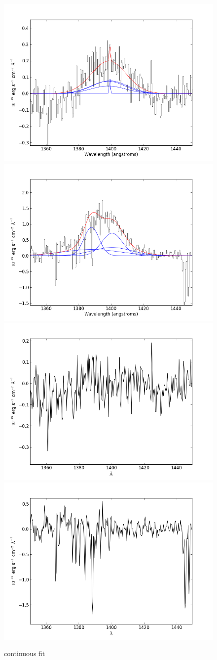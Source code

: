 \documentclass[usenatbib]{mn2e}
\begin{document}
\newpage


\begin{figure}
\begin{center}
\includegraphics[width=0.46\linewidth,angle=0]{SiIV_4.png}
\vspace{5mm}
\includegraphics[width=0.49\linewidth,angle=0]{SiIV_5.png}\\
\includegraphics[width=0.46\linewidth,angle=0]{SiIV_res_4.png}
\hspace{5mm}
\includegraphics[width=0.49\linewidth,angle=0]{SiIV_res_5.png}\\
\end{center} 
\caption{continuous fit \label{fig:landscape}}   
\end{figure}
\end{document}
